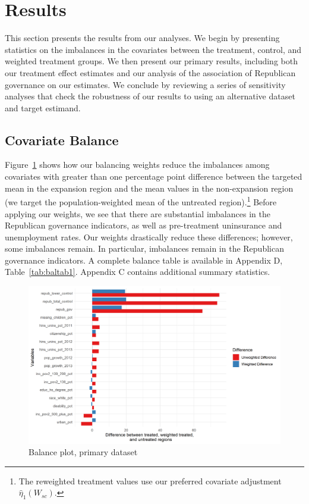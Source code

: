 \documentclass{article}
\begin{document}
\section{Results}

This section presents the results from our analyses. We begin by presenting statistics on the imbalances in the covariates between the treatment, control, and weighted treatment groups. We then present our primary results, including both our treatment effect estimates and our analysis of the association of Republican governance on our estimates. We conclude by reviewing a series of sensitivity analyses that check the robustness of our results to using an alternative dataset and target estimand.

\subsection{Covariate Balance}

Figure~\ref{fig:loveplotc1} shows how our balancing weights reduce the imbalances among covariates with greater than one percentage point difference between the targeted mean in the expansion region and the mean values in the non-expansion region (we target the population-weighted mean of the untreated region).\footnote{The reweighted treatment values use our preferred covariate adjustment $\hat{\eta}_1(W_{sc})$.} Before applying our weights, we see that there are substantial imbalances in the Republican governance indicators, as well as pre-treatment uninsurance and unemployment rates. Our weights drastically reduce these differences; however, some imbalances remain. In particular, imbalances remain in the Republican governance indicators. A complete balance table is available in Appendix D, Table~\ref{tab:baltab1}. Appendix C contains additional summary statistics. 

\begin{figure}[B]
\begin{center}
    \caption{Balance plot, primary dataset}
    \label{fig:loveplotc1}
    \includegraphics[scale=0.6]{01_Plots/balance-plot-etu.png}
\end{center}
\end{figure}
\end{document}
